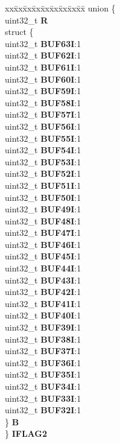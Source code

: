 \begin{DoxyCompactItemize}
\begin{tabbing}
\end{tabbing}\item 
\mbox{\label{structFLEXCAN__tag_af08e5c8e01075bc1744b10333ac786ae}} 
\begin{tabbing}
xx\=xx\=xx\=xx\=xx\=xx\=xx\=xx\=xx\=\kill
union \{\\
\>uint32\_t {\bfseries R}\\
\>struct \{\\
\>\>uint32\_t {\bfseries BUF63I}:1\\
\>\>uint32\_t {\bfseries BUF62I}:1\\
\>\>uint32\_t {\bfseries BUF61I}:1\\
\>\>uint32\_t {\bfseries BUF60I}:1\\
\>\>uint32\_t {\bfseries BUF59I}:1\\
\>\>uint32\_t {\bfseries BUF58I}:1\\
\>\>uint32\_t {\bfseries BUF57I}:1\\
\>\>uint32\_t {\bfseries BUF56I}:1\\
\>\>uint32\_t {\bfseries BUF55I}:1\\
\>\>uint32\_t {\bfseries BUF54I}:1\\
\>\>uint32\_t {\bfseries BUF53I}:1\\
\>\>uint32\_t {\bfseries BUF52I}:1\\
\>\>uint32\_t {\bfseries BUF51I}:1\\
\>\>uint32\_t {\bfseries BUF50I}:1\\
\>\>uint32\_t {\bfseries BUF49I}:1\\
\>\>uint32\_t {\bfseries BUF48I}:1\\
\>\>uint32\_t {\bfseries BUF47I}:1\\
\>\>uint32\_t {\bfseries BUF46I}:1\\
\>\>uint32\_t {\bfseries BUF45I}:1\\
\>\>uint32\_t {\bfseries BUF44I}:1\\
\>\>uint32\_t {\bfseries BUF43I}:1\\
\>\>uint32\_t {\bfseries BUF42I}:1\\
\>\>uint32\_t {\bfseries BUF41I}:1\\
\>\>uint32\_t {\bfseries BUF40I}:1\\
\>\>uint32\_t {\bfseries BUF39I}:1\\
\>\>uint32\_t {\bfseries BUF38I}:1\\
\>\>uint32\_t {\bfseries BUF37I}:1\\
\>\>uint32\_t {\bfseries BUF36I}:1\\
\>\>uint32\_t {\bfseries BUF35I}:1\\
\>\>uint32\_t {\bfseries BUF34I}:1\\
\>\>uint32\_t {\bfseries BUF33I}:1\\
\>\>uint32\_t {\bfseries BUF32I}:1\\
\>\} {\bfseries B}\\
\} {\bfseries IFLAG2}\\


\end{tabbing}
\end{DoxyCompactItemize}
